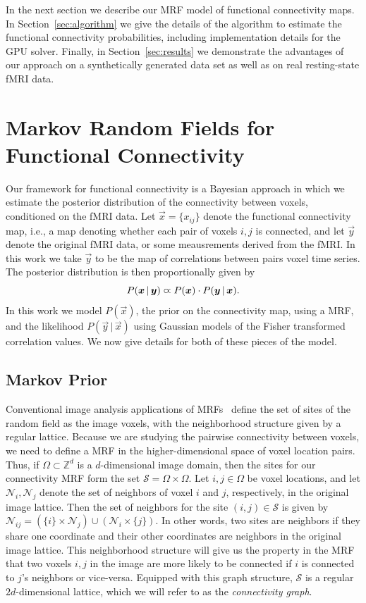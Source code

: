 \documentclass[runningheads,a4paper]{llncs}
\begin{document}
In the next section we describe our MRF model of functional connectivity maps.
In Section~\ref{sec:algorithm} we give the details of the algorithm to estimate
the functional connectivity probabilities, including implementation details for
the GPU solver. Finally, in Section~\ref{sec:results} we demonstrate the
advantages of our approach on a synthetically generated data set as well as on
real resting-state fMRI data.

\section{Markov Random Fields for Functional Connectivity}
\label{sec:model}

Our framework for functional connectivity is a Bayesian approach in
which we estimate the posterior distribution of the connectivity
between voxels, conditioned  on the fMRI data. Let $\vec x =
\{x_{ij}\}$ denote the functional connectivity map, i.e., a map
denoting whether each pair of voxels $i,j$ is connected, and let $\vec
y$ denote the original fMRI data, or some meausrements derived from
the fMRI. In this work we take $\vec y$ to be the map of correlations
between pairs voxel time series. The posterior distribution is then
proportionally given by
\begin{equation}
\label{eq:posterior}
P(\vec x \, | \, \vec y) \prop P(\vec x) \cdot P(\vec y \, | \, \vec x).
\end{equation}
In this work we model $P(\vec x)$, the prior on the connectivity map, using a
MRF, and the likelihood $P(\vec y \, | \, \vec x)$ using Gaussian models of the
Fisher transformed correlation values. We now give details for both of these
pieces of the model.
\subsection{Markov Prior}
Conventional image analysis applications of MRFs~\cite{li_markov_2009} define the set of
sites of the random field as the image voxels, with the neighborhood structure
given by a regular lattice. Because we are studying the pairwise connectivity
between voxels, we need to define a MRF in the higher-dimensional space of voxel
location pairs. Thus, if $\Omega \subset \mathbb{Z}^d$ is a $d$-dimensional
image domain, then the sites for our connectivity MRF form the set $\mathcal{S}
= \Omega \times \Omega$. Let $i, j \in \Omega$ be voxel locations, and let
$\mathcal{N}_i, \mathcal{N}_j$ denote the set of neighbors of voxel $i$ and $j$,
respectively, in the original image lattice. Then the set of neighbors for the
site $(i, j) \in \mathcal{S}$ is given by $\mathcal{N}_{ij} = (\{i\} \times
\mathcal{N}_j) \cup (\mathcal{N}_i \times \{j\})$. In other words, two sites are
neighbors if they share one coordinate and their other coordinates are neighbors
in the original image lattice. This neighborhood structure will give us the
property in the MRF that two voxels $i, j$ in the image are more likely to be
connected if $i$ is connected to $j$'s neighbors or vice-versa. Equipped with
this graph structure, $\mathcal{S}$ is a regular $2d$-dimensional lattice, which
we will refer to as the {\em connectivity graph}.
\end{document}
